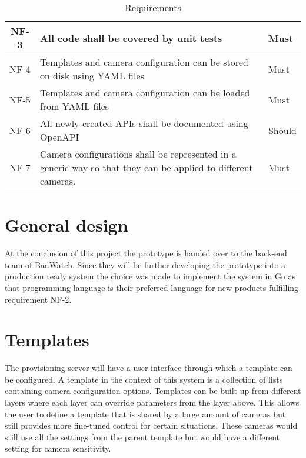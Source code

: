 \begin{table*}[h]
\begin{tabulary}{\linewidth}{CLL}
        \\ \hline
        NF-3 & All code shall be covered by unit tests & Must
        \\ \hline
        NF-4 & Templates and camera configuration can be stored on disk using YAML files & Must
        \\ \hline
        NF-5 & Templates and camera configuration can be loaded from YAML files & Must
        \\ \hline %
        NF-6 & All newly created APIs shall be documented using OpenAPI & Should
        \\ \hline
        NF-7 & Camera configurations shall be represented in a generic way so that they can be applied to different cameras. & Must
    \end{tabulary}
    \caption{Requirements}
    \label{tab:requirements}
\end{table*}

\section{General design}
At the conclusion of this project the prototype is handed over to the back-end team of BauWatch.
Since they will be further developing the prototype into a production ready system the choice was made to implement the system in Go as that programming language is their preferred language for new products fulfilling requirement NF-2.

\section{Templates}
The provisioning server will have a user interface through which a template can be configured.
A template in the context of this system is a collection of lists containing camera configuration options.
Templates can be built up from different layers where each layer can override parameters from the layer above.
This allows the user to define a template that is shared by a large amount of cameras but still provides more fine-tuned control for certain situations.
These cameras would still use all the settings from the parent template but would have a different setting for camera sensitivity.

